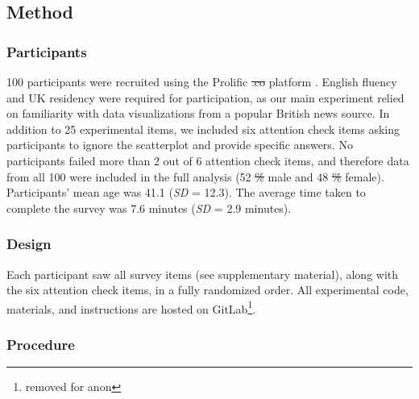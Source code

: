 \documentclass[manuscript,screen,review,anonymous]{acmart}
\providecommand{\DIFdeltex}[1]{{\protect\color{red}\sout{#1}}} %
\providecommand{\DIFdelbegin}{} %
\providecommand{\DIFdelend}{} %
\providecommand{\DIFdel}[1]{\texorpdfstring{\DIFdeltex{#1}}{}} %
\newcommand{\DIFscaledelfig}{0.5}
\newlength{\DIFdelgraphicswidth} %
\newlength{\DIFdelgraphicsheight} %
\newcommand{\DIFdelincludegraphics}[2][]{%
\sbox{\DIFdelgraphicsbox}{\DIFOincludegraphics[#1]{#2}}%
\settoboxwidth{\DIFdelgraphicswidth}{\DIFdelgraphicsbox} %
\settoboxtotalheight{\DIFdelgraphicsheight}{\DIFdelgraphicsbox} %
\scalebox{\DIFscaledelfig}{%
\parbox[b]{\DIFdelgraphicswidth}{\usebox{\DIFdelgraphicsbox}\\[-\baselineskip] \rule{\DIFdelgraphicswidth}{0em}}\llap{\resizebox{\DIFdelgraphicswidth}{\DIFdelgraphicsheight}{%
\setlength{\unitlength}{\DIFdelgraphicswidth}%
\begin{picture}(1,1)%
\thicklines\linethickness{2pt} %
{\color[rgb]{1,0,0}\put(0,0){\framebox(1,1){}}}%
{\color[rgb]{1,0,0}\put(0,0){\line( 1,1){1}}}%
{\color[rgb]{1,0,0}\put(0,1){\line(1,-1){1}}}%
\end{picture}%
}\hspace*{3pt}}} %
} %
\DeclareRobustCommand{\DIFdelbegin}{\DIFOdelbegin \let\includegraphics\DIFdelincludegraphics} %
\DeclareRobustCommand{\DIFdelend}{\DIFOaddend \let\includegraphics\DIFOincludegraphics} %
\begin{document}
\subsection{Method}\label{sec-method-pre}

\subsubsection{Participants}\label{sec-participants-pre}

100 participants were recruited using the Prolific \DIFdelbegin \DIFdel{.co }\DIFdelend platform
\citep{prolific}. English fluency and UK residency were required for
participation, as our main experiment relied on familiarity with data
visualizations from a popular British news source. In addition to 25
experimental items, we included six attention check items asking
participants to ignore the scatterplot and provide specific answers. No
participants failed more than 2 out of 6 attention check items, and
therefore data from all 100 were included in the full analysis (52 \DIFdelbegin \DIFdel{\%
}\DIFdelend male
and 48 \DIFdelbegin \DIFdel{\% }\DIFdelend female). Participants' mean age was 41.1 (\emph{SD} = 12.3). The
average time taken to complete the survey was 7.6 minutes (\emph{SD} =
2.9 minutes).

\subsubsection{Design}\label{sec-design-pre}

Each participant saw all survey items (see supplementary material),
along with the six attention check items, in a fully randomized order.
All experimental code, materials, and instructions are hosted on
GitLab\footnote{removed for anon}.

\subsubsection{Procedure}\label{sec-procedure-pre}
\end{document}
